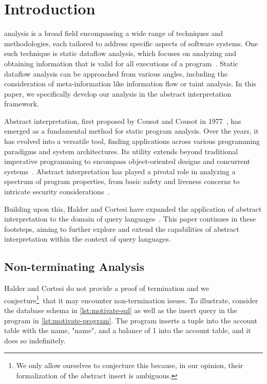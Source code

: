 \section{Introduction}\label{sec:introduction}
 analysis is a broad field encompassing a wide range of techniques and methodologies, each tailored to address specific aspects of software systems.
One such technique is static dataflow analysis, which focuses on analyzing and obtaining information that is valid for all executions of a program~\cite{moller_statitc_nodate}.
Static dataflow analysis can be approached from various angles, including the consideration of meta-information like information flow or taint analysis.
In this paper, we specifically develop our analysis in the abstract interpretation framework.

Abstract interpretation, first proposed by Cousot and Cousot in 1977~\cite{cousot_abstract_1977}, has emerged as a fundamental method for static program analysis.
Over the years, it has evolved into a versatile tool, finding applications across various programming paradigms and system architectures.
Its utility extends beyond traditional imperative programming to encompass object-oriented designs and concurrent systems~\cite{gustafsson_analyzing_2013, mine_static_2023}.
Abstract interpretation has played a pivotal role in analyzing a spectrum of program properties, from basic safety and liveness concerns to intricate security considerations~\cite{mastroeni_abstract_2011}.

Building upon this, Halder and Cortesi have expanded the application of abstract interpretation to the domain of query languages~\cite{halder_abstract_2012}.
This paper continues in these footsteps, aiming to further explore and extend the capabilities of abstract interpretation within the context of query languages.


\subsection{Non-terminating Analysis}\label{subsec:non-terminating-analysis}
Halder and Cortesi do not provide a proof of termination and we conjecture\footnote{We only allow ourselves to conjecture this because, in our opinion, their formalization of the abstract insert is ambiguous.}~that it may encounter non-termination issues.
To illustrate, consider the database schema in \autoref{lst:motivate-sql} as well as the insert query in the program in \autoref{lst:motivate-program}.
The program inserts a tuple into the account table with the name, "name", and a balance of 1 into the account table, and it does so indefinitely.


